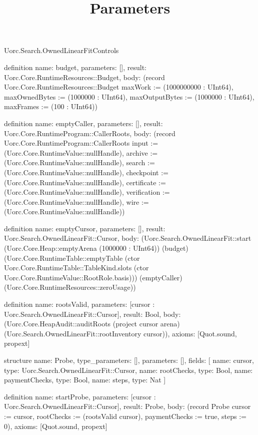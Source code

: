 \begin{lexlean}{Uorc.Search.OwnedLinearFitControls}
\title{Parameters}
\begin{semanticmodule}
definition{
  name: budget,
  parameters: [],
  result: Uorc.Core.RuntimeResources::Budget,
  body: (record Uorc.Core.RuntimeResources::Budget {maxWork := (1000000000 : UInt64), maxOwnedBytes := (1000000 : UInt64), maxOutputBytes := (1000000 : UInt64), maxFrames := (100 : UInt64)})
}

definition{
  name: emptyCaller,
  parameters: [],
  result: Uorc.Core.RuntimeProgram::CallerRoots,
  body: (record Uorc.Core.RuntimeProgram::CallerRoots {input := (Uorc.Core.RuntimeValue::nullHandle), archive := (Uorc.Core.RuntimeValue::nullHandle), search := (Uorc.Core.RuntimeValue::nullHandle), checkpoint := (Uorc.Core.RuntimeValue::nullHandle), certificate := (Uorc.Core.RuntimeValue::nullHandle), verification := (Uorc.Core.RuntimeValue::nullHandle), wire := (Uorc.Core.RuntimeValue::nullHandle)})
}

definition{
  name: emptyCursor,
  parameters: [],
  result: Uorc.Search.OwnedLinearFit::Cursor,
  body: (Uorc.Search.OwnedLinearFit::start (Uorc.Core.Heap::emptyArena (1000000 : UInt64)) (budget) (Uorc.Core.RuntimeTable::emptyTable (ctor Uorc.Core.RuntimeTable::TableKind.slots (ctor Uorc.Core.RuntimeValue::RootRole.basis))) (emptyCaller) (Uorc.Core.RuntimeResources::zeroUsage))
}

definition{
  name: rootsValid,
  parameters: [cursor : Uorc.Search.OwnedLinearFit::Cursor],
  result: Bool,
  body: (Uorc.Core.HeapAudit::auditRoots (project cursor arena) (Uorc.Search.OwnedLinearFit::rootInventory cursor)),
  axioms: [Quot.sound, propext]
}

structure{
  name: Probe,
  type_parameters: [],
  parameters: [],
  fields: [
    {name: cursor, type: Uorc.Search.OwnedLinearFit::Cursor},
    {name: rootChecks, type: Bool},
    {name: paymentChecks, type: Bool},
    {name: steps, type: Nat}
  ]
}

definition{
  name: startProbe,
  parameters: [cursor : Uorc.Search.OwnedLinearFit::Cursor],
  result: Probe,
  body: (record Probe {cursor := cursor, rootChecks := (rootsValid cursor), paymentChecks := true, steps := 0}),
  axioms: [Quot.sound, propext]
}


\end{semanticmodule}
\end{lexlean}
